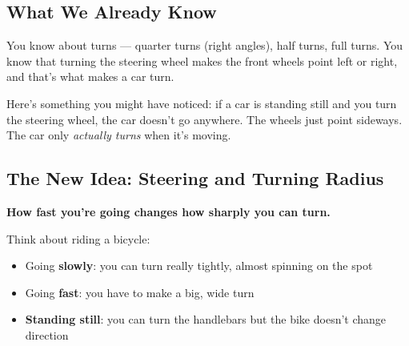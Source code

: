 \documentclass[11pt,a4paper]{article}
\newcommand{\drawcar}[4][]{%
  \begin{scope}[shift={(#2,#3)},rotate=#4,#1]
    \fill[carred,rounded corners=4pt] (-0.25,-0.6) rectangle (0.25,0.6);
    \fill[carred] (-0.2,0.6) -- (0,0.85) -- (0.2,0.6) -- cycle;
    \fill[black!80] (-0.35,-0.45) rectangle (-0.25,-0.25);
    \fill[black!80] (0.25,-0.45) rectangle (0.35,-0.25);
    \fill[black!80] (-0.35,0.25) rectangle (-0.25,0.45);
    \fill[black!80] (0.25,0.25) rectangle (0.35,0.45);
    \fill[white] (0,0) circle (0.04);
  \end{scope}
}
\begin{document}
\subsection{What We Already Know}

You know about turns --- quarter turns (right angles), half turns, full turns. You know that turning the steering wheel makes the front wheels point left or right, and that's what makes a car turn.

Here's something you might have noticed: if a car is standing still and you turn the steering wheel, the car doesn't go anywhere. The wheels just point sideways. The car only \emph{actually turns} when it's moving.

\subsection{The New Idea: Steering and Turning Radius}

\textbf{How fast you're going changes how sharply you can turn.}

Think about riding a bicycle:
\begin{itemize}[nosep]
  \item Going \textbf{slowly}: you can turn really tightly, almost spinning on the spot
  \item Going \textbf{fast}: you have to make a big, wide turn
  \item \textbf{Standing still}: you can turn the handlebars but the bike doesn't change direction
\end{itemize}

\begin{center}
\end{center}
\end{document}
